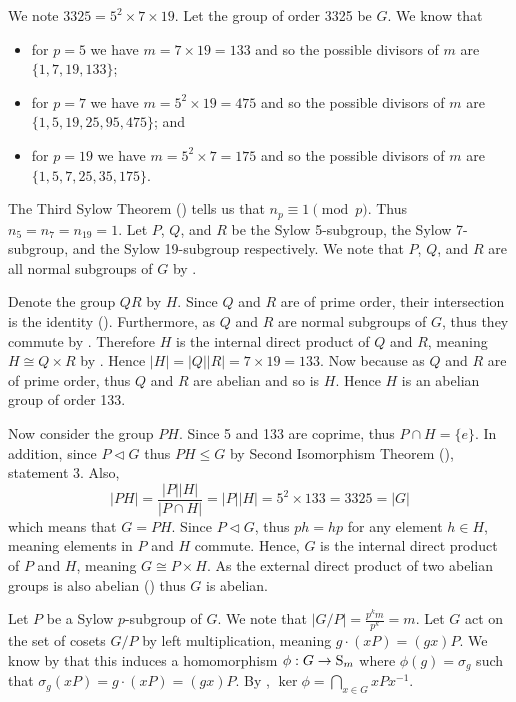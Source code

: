\begin{questions}
    \item We note $3325 = 5^2 \times 7 \times 19$. Let the group of order 3325 be $G$. We know that
    \begin{itemize}
        \item for $p = 5$ we have $m = 7 \times 19 = 133$ and so the possible divisors of $m$ are $\{1, 7, 19, 133\}$;
        \item for $p = 7$ we have $m = 5^2 \times 19 = 475$ and so the possible divisors of $m$ are $\{1, 5, 19, 25, 95, 475\}$; and
        \item for $p = 19$ we have $m = 5^2 \times 7 = 175$ and so the possible divisors of $m$ are $\{1, 5, 7, 25, 35, 175\}$.
    \end{itemize}
    The Third Sylow Theorem () tells us that $n_p \equiv 1 \pmod p$. Thus $n_5 = n_7 = n_{19} = 1$. Let $P$, $Q$, and $R$ be the Sylow 5-subgroup, the Sylow 7-subgroup, and the Sylow 19-subgroup respectively. We note that $P$, $Q$, and $R$ are all normal subgroups of $G$ by .

    Denote the group $QR$ by $H$. Since $Q$ and $R$ are of prime order, their intersection is the identity (). Furthermore, as $Q$ and $R$ are normal subgroups of $G$, thus they commute by . Therefore $H$ is the internal direct product of $Q$ and $R$, meaning $H \cong Q \times R$ by . Hence $|H| = |Q||R| = 7 \times 19 = 133$. Now because as $Q$ and $R$ are of prime order, thus $Q$ and $R$ are abelian and so is $H$. Hence $H$ is an abelian group of order 133.

    Now consider the group $PH$. Since 5 and 133 are coprime, thus $P \cap H = \{e\}$. In addition, since $P \lhd G$ thus $PH \leq G$ by Second Isomorphism Theorem (), statement 3. Also,
    \[
        |PH| = \frac{|P||H|}{|P \cap H|} = |P||H| = 5^2 \times 133 = 3325 = |G|
    \]
    which means that $G = PH$. Since $P \lhd G$, thus $ph = hp$ for any element $h \in H$, meaning elements in $P$ and $H$ commute. Hence, $G$ is the internal direct product of $P$ and $H$, meaning $G \cong P \times H$. As the external direct product of two abelian groups is also abelian () thus $G$ is abelian.

    \item Let $P$ be a Sylow $p$-subgroup of $G$. We note that $|G/P| = \frac{p^km}{p^k} = m$. Let $G$ act on the set of cosets $G/P$ by left multiplication, meaning $g\cdot (xP) = (gx)P$. We know by  that this induces a homomorphism $\phi: G \to \mathrm{S}_{m}$ where $\phi(g) = \sigma_g$ such that $\sigma_g(xP) = g\cdot (xP) = (gx)P$. By , $\ker\phi = \bigcap_{x \in G}xPx^{-1}$.


\end{questions}
